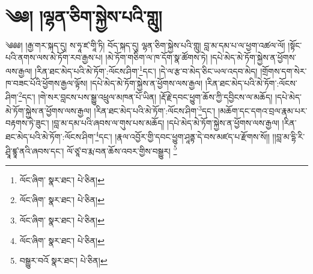 \setcounter{footnote}{0} 
\chapter{༄༅། །ལྷན་ཅིག་སྐྱེས་པའི་གླུ།}༄༅༅། །རྒྱ་གར་སྐད་དུ། ས་ཧཱ་ཛ་གཱི་ཏི། བོད་སྐད་དུ། ལྷན་ཅིག་སྐྱེས་པའི་གླུ། བླ་མ་དམ་པ་ལ་ཕྱག་འཚལ་ལོ། །སྟོང་པའི་ནགས་ལས་མེ་ཏོག་རབ་རྒྱས་པ། །མེ་ཏོག་གཅིག་ལ་ཁ་དོག་སྣ་ཚོགས་ཏེ། །དཔེ་མེད་མེ་ཏོག་སྐྱེས་ན་ཕྱོགས་ལས་རྒྱལ། །རིན་ཐང་མེད་པའི་མེ་ཏོག་:ལོངས་ཤིག་\footnote{ལོང་ཞིག་  སྣར་ཐང་།  པེ་ཅིན། }དང་། །དེ་ལ་རྩ་བ་མེད་ཅིང་ཡལ་འདབ་མེད། །གྲོགས་དག་སེར་ཁ་བཟང་པོའི་ཕྱོགས་རྒྱལ་ལྟོས། །དཔེ་མེད་མེ་ཏོག་སྐྱེས་ན་ཕྱོགས་ལས་རྒྱལ། །རིན་ཐང་མེད་པའི་མེ་ཏོག་:ལོངས་ཤིག་\footnote{ལོང་ཞིག་  སྣར་ཐང་།  པེ་ཅིན། }དང་། །གེ་སར་བླངས་པས་སྒྱུ་འཕྲུལ་མཁན་པོ་ཡིན། །རྡོ་རྗེ་དབང་ཕྱུག་ཆོས་ཀྱི་དབྱིངས་ལ་མཆོད། །དཔེ་མེད་མེ་ཏོག་སྐྱེས་ན་ཕྱོགས་ལས་རྒྱལ། །རིན་ཐང་མེད་པའི་མེ་ཏོག་:ལོངས་ཤིག་\footnote{ལོང་ཞིག་  སྣར་ཐང་།  པེ་ཅིན། }དང་། །མཆོག་དང་དགའ་བྲལ་རྣམ་པར་བརྟགས་ཏེ་ཟུང་། །བླ་མ་དམ་པའི་ཞབས་ལ་གུས་པས་མཆོད། །དཔེ་མེད་མེ་ཏོག་སྐྱེས་ན་ཕྱོགས་ལས་རྒྱལ། །རིན་ཐང་མེད་པའི་མེ་ཏོག་:ལོངས་ཤིག་\footnote{ལོང་ཞིག་  སྣར་ཐང་།  པེ་ཅིན། }དང་། །རྣལ་འབྱོར་གྱི་དབང་ཕྱུག་ཤཱནྟ་དེ་བས་མཛད་པ་རྫོགས་སོ།། །།བླ་མ་དྷི་རི་ཤྲཱི་ཛྙཱ་ནའི་ཞབས་དང་། ལོ་ཙཱ་བ་རྨ་བན་ཆོས་འབར་གྱིས་བསྒྱུར། \footnote{བསྒྱུར་བའོ   སྣར་ཐང་།  པེ་ཅིན། }